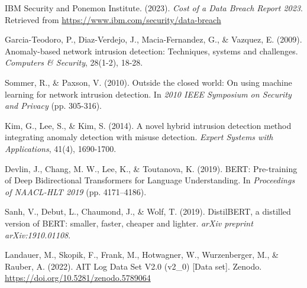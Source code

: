 \documentclass[12pt]{article}
\begin{document}

\begin{thebibliography}{9}
IBM Security and Ponemon Institute. (2023).
\newblock \emph{Cost of a Data Breach Report 2023}.
\newblock Retrieved from \url{https://www.ibm.com/security/data-breach}

Garcia-Teodoro, P., Diaz-Verdejo, J., Macia-Fernandez, G., \& Vazquez, E. (2009).
\newblock Anomaly-based network intrusion detection: Techniques, systems and challenges.
\newblock \emph{Computers \& Security}, 28(1-2), 18-28.

Sommer, R., \& Paxson, V. (2010).
\newblock Outside the closed world: On using machine learning for network intrusion detection.
\newblock In \emph{2010 IEEE Symposium on Security and Privacy} (pp. 305-316).

Kim, G., Lee, S., \& Kim, S. (2014).
\newblock A novel hybrid intrusion detection method integrating anomaly detection with misuse detection.
\newblock \emph{Expert Systems with Applications}, 41(4), 1690-1700.

Devlin, J., Chang, M. W., Lee, K., \& Toutanova, K. (2019).
\newblock BERT: Pre-training of Deep Bidirectional Transformers for Language Understanding.
\newblock In \emph{Proceedings of NAACL-HLT 2019} (pp. 4171–4186).

Sanh, V., Debut, L., Chaumond, J., \& Wolf, T. (2019).
\newblock DistilBERT, a distilled version of BERT: smaller, faster, cheaper and lighter.
\newblock \emph{arXiv preprint arXiv:1910.01108}.

Landauer, M., Skopik, F., Frank, M., Hotwagner, W., Wurzenberger, M., \& Rauber, A. (2022).
\newblock AIT Log Data Set V2.0 (v2\_0) [Data set].
\newblock Zenodo. \url{https://doi.org/10.5281/zenodo.5789064}

\end{thebibliography}
\end{document}

